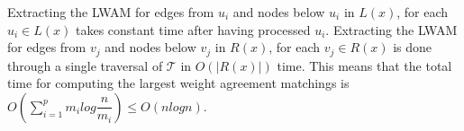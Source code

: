Extracting the LWAM for edges from $u_i$ and nodes below $u_i$ in $L(x)$, for each $u_i \in L(x)$ takes constant time after having processed $u_i$. Extracting the LWAM for edges from $v_j$ and nodes below $v_j$ in $R(x)$, for each $v_j \in R(x)$ is done through a single traversal of $\mathcal{T}$ in $O(|R(x)|)$ time. This means that the total time for computing the largest weight agreement matchings is $O(\sum_{i=1}^p m_ilog\dfrac{n}{m_i}) \le O(nlogn)$.
